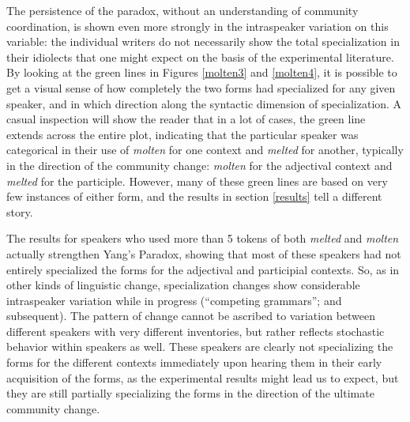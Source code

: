 \documentclass{artikel3}
\begin{document}
The persistence of the paradox, without an understanding of community coordination, is shown even more strongly in the intraspeaker variation on this variable: the individual writers do not necessarily show the total specialization in their idiolects that one might expect on the basis of the experimental literature. By looking at the green lines in Figures \ref{molten3} and \ref{molten4}, it is possible to get a visual sense of how completely the two forms had specialized for any given speaker, and in which direction along the syntactic dimension of specialization. A casual inspection will show the reader that in a lot of cases, the green line extends across the entire plot, indicating that the particular speaker was categorical in their use of \textsl{molten} for one context and \textsl{melted} for another, typically in the direction of the community change: \textsl{molten} for the  adjectival context and \textsl{melted} for the participle. However, many of these green lines are based on very few instances of either form, and the results in section \ref{results} tell a different story. 

The results for speakers who used more than 5 tokens of both \textsl{melted} and \textsl{molten} actually strengthen Yang's Paradox, showing that most of these speakers had not entirely specialized the forms for the adjectival and participial contexts. So, as in other kinds of linguistic change, specialization changes show considerable intraspeaker variation while in progress (``competing grammars''; \citealt{kroch1989} and subsequent). The pattern of change cannot be ascribed to variation between different speakers with very different inventories, but rather reflects stochastic behavior within speakers as well. These speakers are clearly not specializing the forms for the different contexts immediately upon hearing them in their early acquisition of the forms, as the experimental results might lead us to expect, but they are still partially specializing the forms in the direction of the ultimate community change.
\end{document}
